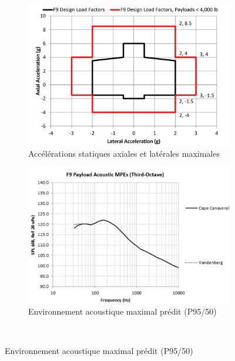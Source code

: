 \begin{figure}[H] %
     \centering
     \begin{subfigure}[]{0.48\textwidth}
         \centering
         \includegraphics[width=\textwidth]{Img/falcon_static.png}
         \caption{Accélérations statiques axiales et latérales maximales}
         \label{fig:falcon9_static}
     \end{subfigure}
     \hfill
     \begin{subfigure}[]{0.48\textwidth}
         \centering
         \includegraphics[width=\textwidth]{Img/falcon_acoustic.png}
         \caption{Environnement acoustique maximal prédit (P95/50)}
         \label{fig:falcon9_acoustic}
     \end{subfigure}
     \\

\end{figure}
